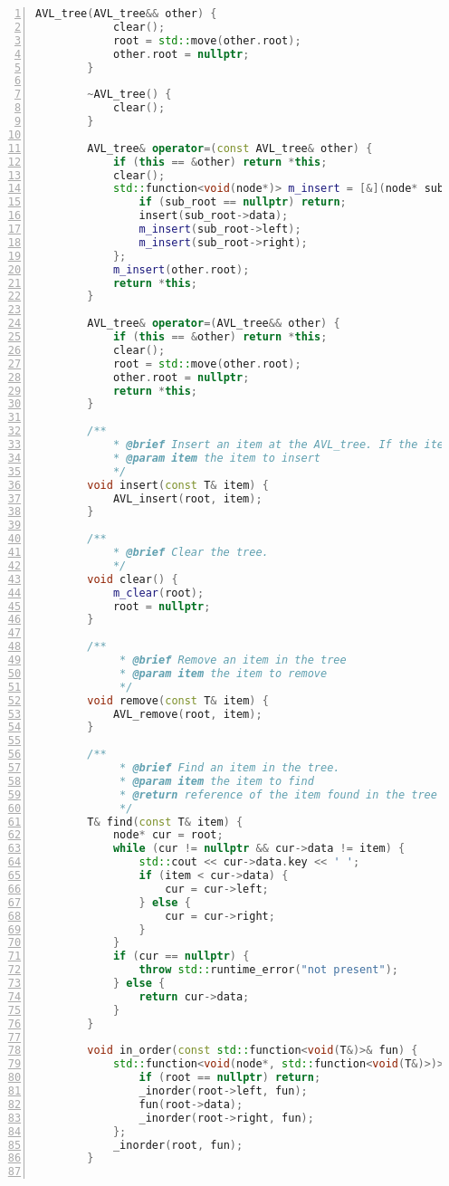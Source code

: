 \documentclass{article}
\begin{document}
\begin{lstlisting}[xleftmargin = 2em,xrightmargin = 2em, aboveskip = 0.5em, numbers = left, language = C++]
        AVL_tree(AVL_tree&& other) {
            clear();
            root = std::move(other.root);
            other.root = nullptr;
        }

        ~AVL_tree() {
            clear();
        }

        AVL_tree& operator=(const AVL_tree& other) {
            if (this == &other) return *this;
            clear();
            std::function<void(node*)> m_insert = [&](node* sub_root) {
                if (sub_root == nullptr) return;
                insert(sub_root->data);
                m_insert(sub_root->left);
                m_insert(sub_root->right);
            };
            m_insert(other.root);
            return *this;
        }

        AVL_tree& operator=(AVL_tree&& other) {
            if (this == &other) return *this;
            clear();
            root = std::move(other.root);
            other.root = nullptr;
            return *this;
        }

        /**
    		* @brief Insert an item at the AVL_tree. If the item is already in the tree, throw a duplicate_errer.
    		* @param item the item to insert
    		*/
        void insert(const T& item) {
            AVL_insert(root, item);
        }

        /**
    		* @brief Clear the tree.
    		*/
        void clear() {
            m_clear(root);
            root = nullptr;
        }

        /**
    		 * @brief Remove an item in the tree
    		 * @param item the item to remove
    		 */
        void remove(const T& item) {
            AVL_remove(root, item);
        }

        /**
    		 * @brief Find an item in the tree.
    		 * @param item the item to find
    		 * @return reference of the item found in the tree
    		 */
        T& find(const T& item) {
            node* cur = root;
            while (cur != nullptr && cur->data != item) {
                std::cout << cur->data.key << ' ';
                if (item < cur->data) {
                    cur = cur->left;
                } else {
                    cur = cur->right;
                }
            }
            if (cur == nullptr) {
                throw std::runtime_error("not present");
            } else {
                return cur->data;
            }
        }

        void in_order(const std::function<void(T&)>& fun) {
            std::function<void(node*, std::function<void(T&)>)> _inorder = [&](node* root, std::function<void(T&)> fun) {
                if (root == nullptr) return;
                _inorder(root->left, fun);
                fun(root->data);
                _inorder(root->right, fun);
            };
            _inorder(root, fun);
        }


\end{lstlisting}
\end{document}
